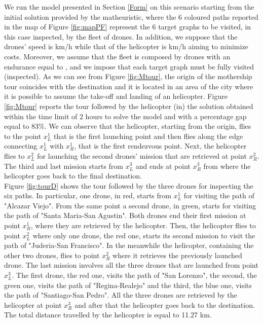 \noindent
We run the model presented in Section \ref{Form} on this scenario starting from the initial solution provided by the matheuristic, where the 6 coloured paths reported in the map of Figure \ref{fig:mapPF} represent the 6 target graphs to be visited, in this case inspected, by the fleet of drones. In addition, we suppose that the drones' speed is  km/h while that of the helicopter is   km/h aiming to minimize costs.
Moreover, we assume that the fleet is composed by  drones with an endurance equal to , and we impose that each target graph must be fully visited (inspected).  As we can see from Figure \ref{fig:Mtour}, the origin of the mothership tour coincides with the destination and it is located in an area of the city where it is possible to assume the take-off and landing of an helicopter. Figure \ref{fig:Mtour} reports the tour followed by the helicopter  (in) the solution obtained within the time limit of 2 hours  to solve the model and with a percentage gap equal to 83\%. We can observe that the helicopter, starting from the origin, flies to the point $x_L^1$ that is the first launching point and then flies along the edge connecting $x_L^1$ with $x_R^1$, that is the first rendezvous point. Next, the helicopter flies to $x_L^2$ for launching the second drones' mission that are retrieved at point $x_R^2$. The third and last mission starts from $x_L^3$ and ends at point $x_R^3$ from where the helicopter goes back to the final destination.\\
Figure \ref{fig:tourD} shows the tour followed by the three drones for inspecting the six paths. In particular, one drone, in red, starts from $x_L^1$ for visiting the path of "Alcazar Viejo". From the same point\CV{,} a second drone, in green, starts for visiting the path of "Santa Maria-San Agustin". Both drones end their first mission at point $x_R^1$, where they are retrieved by the helicopter. Then, the helicopter flies to point $x_L^2$ where only one drone, the red one, starts its second mission to visit the path of "Juderia-San Francisco". In the meanwhile\CV{,} the helicopter, containing the other two drones, flies to point $x_R^2$ where it retrieves the previously launched drone. The last mission involves all the three drones that are launched from point $x_L^3$. The first drone, the red one, visits the path of "San Lorenzo", the second, the green one, visits the path of "Regina-Realejo" and the third, the blue one, visits the path of "Santiago-San Pedro".
All the three drones are retrieved by the helicopter at point $x_R^3$ and after that the helicopter goes back to the destination. 
The total distance travelled by the helicopter is equal to 11.27 km.

